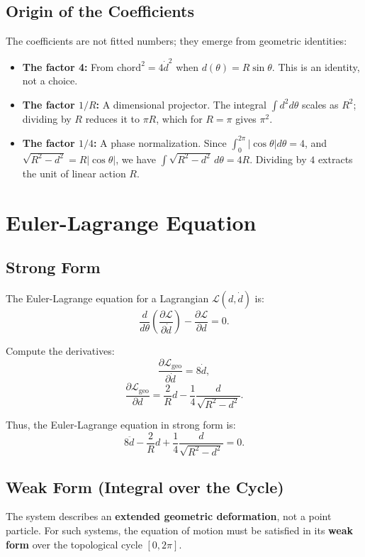 \documentclass[12pt]{article}
\begin{document}
\subsection{Origin of the Coefficients}

The coefficients are not fitted numbers; they emerge from geometric identities:

\begin{itemize}
    \item \textbf{The factor 4:} From $\text{chord}^2 = 4\dot{d}^2$ when $d(\theta) = R\sin\theta$. This is an identity, not a choice.
    \item \textbf{The factor $1/R$:} A dimensional projector. The integral $\int d^2 d\theta$ scales as $R^2$; dividing by $R$ reduces it to $\pi R$, which for $R=\pi$ gives $\pi^2$.
    \item \textbf{The factor $1/4$:} A phase normalization. Since $\int_0^{2\pi}|\cos\theta|d\theta = 4$, and $\sqrt{R^2-d^2} = R|\cos\theta|$, we have $\int \sqrt{R^2-d^2}\,d\theta = 4R$. Dividing by $4$ extracts the unit of linear action $R$.
\end{itemize}

\section{Euler-Lagrange Equation}

\subsection{Strong Form}

The Euler-Lagrange equation for a Lagrangian $\mathcal{L}(d, \dot{d})$ is:
\[
\frac{d}{d\theta}\left(\frac{\partial\mathcal{L}}{\partial\dot{d}}\right) - \frac{\partial\mathcal{L}}{\partial d} = 0.
\]

Compute the derivatives:
\[
\frac{\partial\mathcal{L}_{\text{geo}}}{\partial\dot{d}} = 8\dot{d},
\]
\[
\frac{\partial\mathcal{L}_{\text{geo}}}{\partial d} = \frac{2}{R}d - \frac{1}{4}\frac{d}{\sqrt{R^2-d^2}}.
\]

Thus, the Euler-Lagrange equation in strong form is:
\[
\boxed{8\ddot{d} - \frac{2}{R}d + \frac{1}{4}\frac{d}{\sqrt{R^2-d^2}} = 0}.
\]

\subsection{Weak Form (Integral over the Cycle)}

The system describes an \textbf{extended geometric deformation}, not a point particle. For such systems, the equation of motion must be satisfied in its \textbf{weak form} over the topological cycle $[0, 2\pi]$.
\end{document}
